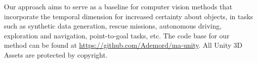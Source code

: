 Our approach aims to serve as a baseline for computer vision methods that incorporate the temporal dimension for increased certainty about objects, in tasks such as synthetic data generation, rescue missions, autonomous driving, exploration and navigation, point-to-goal tasks, etc. The code base for our method can be found at \url{https://github.com/Ademord/ma-unity}. All Unity 3D Assets are protected by copyright.








